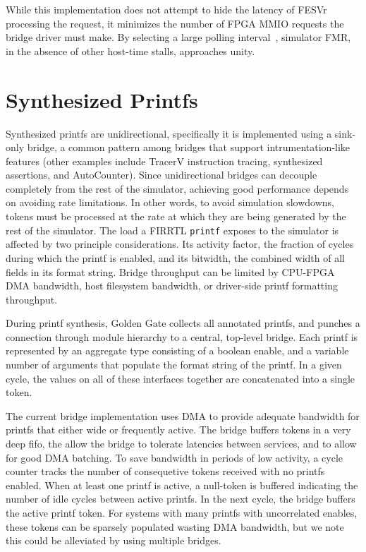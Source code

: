 While this implementation does not attempt to hide the latency of FESVr
processing the request, it minimizes the number of FPGA MMIO requests the
bridge driver must make. By selecting a large polling interval~,
simulator FMR, in the absence of other host-time stalls, approaches unity.

\section{Synthesized Printfs}

Synthesized printfs are unidirectional, specifically it is implemented using a
sink-only bridge, a common pattern among bridges that support
intrumentation-like features (other examples include TracerV instruction
tracing, synthesized assertions, and AutoCounter). Since unidirectional bridges
can decouple completely from the rest of the simulator, achieving good
performance depends on avoiding rate limitations. In other words, to avoid
simulation slowdowns, tokens must be processed at the rate at which they are
being generated by the rest of the simulator.  The load a FIRRTL
\texttt{printf} exposes to the simulator is affected by two principle
considerations. Its activity factor, the fraction of cycles during which the
printf is enabled, and its bitwidth, the combined width of all fields in its
format string. Bridge throughput can be limited by CPU-FPGA DMA bandwidth,
host filesystem bandwidth, or driver-side printf formatting throughput.

During printf synthesis, Golden Gate collects all annotated printfs, and
punches a connection through module hierarchy to a central, top-level bridge.
Each printf is represented by an aggregate type consisting of a boolean enable,
and a variable number of arguments that populate the format string of the
printf. In a given cycle, the values on all of these interfaces
together are concatenated into a single token.

The current bridge implementation uses DMA to provide adequate bandwidth for
printfs that either wide or frequently active. The bridge buffers tokens in
a very deep fifo, the allow the bridge to tolerate latencies between services,
and to allow for good DMA batching.  To save bandwidth in periods of low
activity, a cycle counter tracks the number of consequetive tokens received
with no printfs enabled.  When at least one printf is active, a null-token is
buffered indicating the number of idle cycles between active printfs. In the
next cycle, the bridge buffers the active printf token. For systems with many
printfs with uncorrelated enables, these tokens can be sparsely populated
wasting DMA bandwidth, but we note this could be alleviated by using multiple
bridges.

